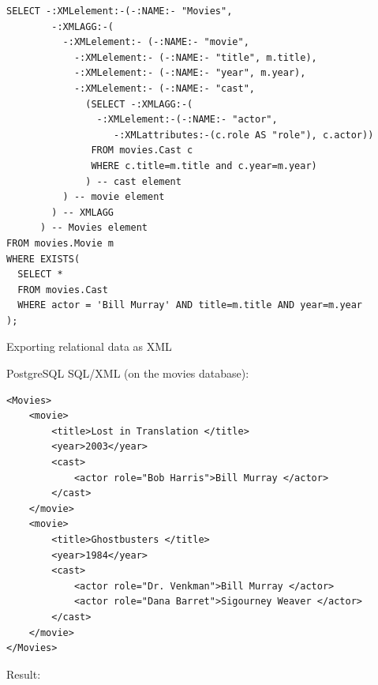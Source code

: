 \newsavebox\movieCastSQLXML
\begin{lrbox}{\movieCastSQLXML}
\begin{lstlisting}[style=SQL]
SELECT -:XMLelement:-(-:NAME:- "Movies",
        -:XMLAGG:-(
          -:XMLelement:- (-:NAME:- "movie",
            -:XMLelement:- (-:NAME:- "title", m.title),
            -:XMLelement:- (-:NAME:- "year", m.year),
            -:XMLelement:- (-:NAME:- "cast",
              (SELECT -:XMLAGG:-(
                -:XMLelement:-(-:NAME:- "actor", 
                   -:XMLattributes:-(c.role AS "role"), c.actor))
               FROM movies.Cast c 
               WHERE c.title=m.title and c.year=m.year)
              ) -- cast element 
          ) -- movie element
        ) -- XMLAGG
      ) -- Movies element
FROM movies.Movie m
WHERE EXISTS(
  SELECT * 
  FROM movies.Cast
  WHERE actor = 'Bill Murray' AND title=m.title AND year=m.year
);
\end{lstlisting}
\end{lrbox}

\begin{frame}[fragile]{Exporting relational data as XML}

 PostgreSQL SQL/XML (on the movies database):

\begin{center}
\scalebox{0.75}{\usebox{\movieCastSQLXML}}
\end{center}
\end{frame}

\newsavebox\movieCastXMLdump
\begin{lrbox}{\movieCastXMLdump}
\begin{lstlisting}[style=markup]
<Movies>
    <movie>
        <title>Lost in Translation </title>
        <year>2003</year>
        <cast>
            <actor role="Bob Harris">Bill Murray </actor>
        </cast>
    </movie>
    <movie>
        <title>Ghostbusters </title>
        <year>1984</year>
        <cast>
            <actor role="Dr. Venkman">Bill Murray </actor>
            <actor role="Dana Barret">Sigourney Weaver </actor>
        </cast>
    </movie>
</Movies>
\end{lstlisting}
\end{lrbox}

\begin{frame}[fragile]

Result:

\begin{center}
\scalebox{0.75}{\usebox{\movieCastXMLdump}}
\end{center}

\end{frame}


